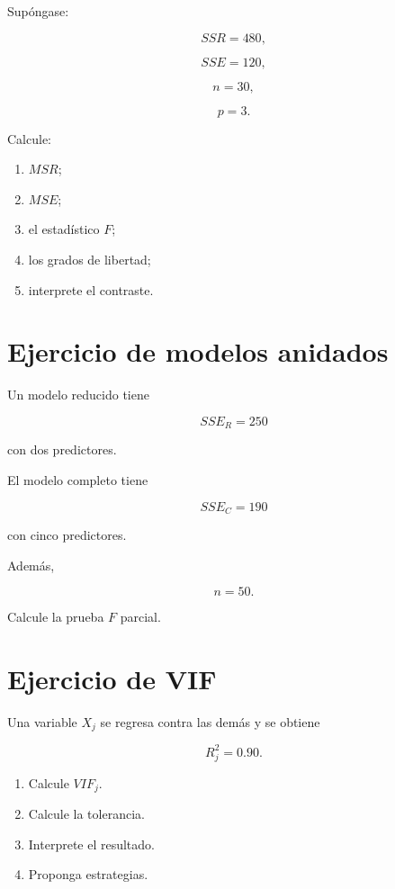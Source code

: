 \documentclass[
  spanish,
  10.5pt,
  letterpaper,
  DIV=11,
  numbers=noendperiod,
  oneside,
  open=any]{scrreprt}
\providecommand{\tightlist}{%
  \setlength{\itemsep}{0pt}\setlength{\parskip}{0pt}}
\theoremstyle{definition}
\theoremstyle{definition}
\theoremstyle{plain}
\theoremstyle{remark}
\begin{document}

Supóngase:

\[
SSR=480,
\]

\[
SSE=120,
\]

\[
n=30,
\]

\[
p=3.
\]

Calcule:

\begin{enumerate}
\def\labelenumi{\arabic{enumi}.}
\tightlist
\item
  \(MSR\);
\item
  \(MSE\);
\item
  el estadístico \(F\);
\item
  los grados de libertad;
\item
  interprete el contraste.
\end{enumerate}

\section*{Ejercicio de modelos
anidados}\label{ejercicio-de-modelos-anidados}


Un modelo reducido tiene

\[
SSE_R=250
\]

con dos predictores.

El modelo completo tiene

\[
SSE_C=190
\]

con cinco predictores.

Además,

\[
n=50.
\]

Calcule la prueba \(F\) parcial.

\section*{Ejercicio de VIF}\label{ejercicio-de-vif}


Una variable \(X_j\) se regresa contra las demás y se obtiene

\[
R_j^2=0.90.
\]

\begin{enumerate}
\def\labelenumi{\arabic{enumi}.}
\tightlist
\item
  Calcule \(VIF_j\).
\item
  Calcule la tolerancia.
\item
  Interprete el resultado.
\item
  Proponga estrategias.
\end{enumerate}
\end{document}
